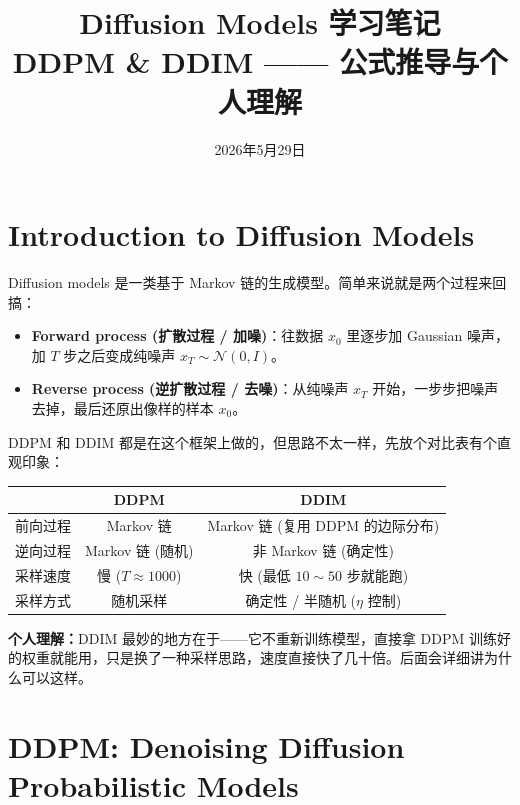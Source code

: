 \documentclass[11pt,a4paper]{article}
\title{\Huge Diffusion Models 学习笔记\\[0.3cm]
       \large DDPM \& DDIM —— 公式推导与个人理解}
\author{}
\date{2026年5月29日}
\theoremstyle{definition}
\newcommand{\N}{\mathcal{N}}          %
\begin{document}
\maketitle
\tableofcontents
\newpage

\section{Introduction to Diffusion Models}

Diffusion models 是一类基于 Markov 链的生成模型。简单来说就是两个过程来回搞：

\begin{itemize}
    \item \textbf{Forward process (扩散过程 / 加噪)}：往数据 $x_0$ 里逐步加 Gaussian 噪声，加 $T$ 步之后变成纯噪声 $x_T \sim \N(0, I)$。
    \item \textbf{Reverse process (逆扩散过程 / 去噪)}：从纯噪声 $x_T$ 开始，一步步把噪声去掉，最后还原出像样的样本 $x_0$。
\end{itemize}

DDPM 和 DDIM 都是在这个框架上做的，但思路不太一样，先放个对比表有个直观印象：

\begin{center}
\begin{tabular}{c|c|c}
    \toprule
    & \textbf{DDPM} & \textbf{DDIM} \\
    \midrule
    前向过程 & Markov 链 & Markov 链 (复用 DDPM 的边际分布) \\
    逆向过程 & Markov 链 (随机) & 非 Markov 链 (确定性) \\
    采样速度 & 慢 ($T \approx 1000$) & 快 (最低 $10\sim 50$ 步就能跑) \\
    采样方式 & 随机采样 & 确定性 / 半随机 ($\eta$ 控制) \\
    \bottomrule
\end{tabular}
\end{center}

\textbf{个人理解：}DDIM 最妙的地方在于——它不重新训练模型，直接拿 DDPM 训练好的权重就能用，只是换了一种采样思路，速度直接快了几十倍。后面会详细讲为什么可以这样。\par


\section{DDPM: Denoising Diffusion Probabilistic Models}
\end{document}
